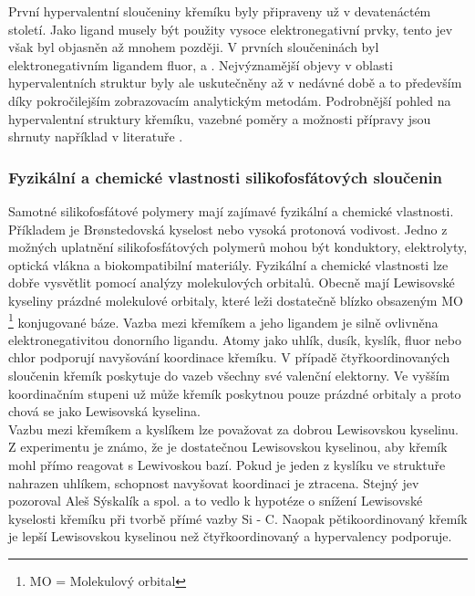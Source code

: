 \documentclass[
  digital, %
  table,   %
  lof,     %
  lot,     %
]{fithesis3}
\begin{document}
První hypervalentní sloučeniny křemíku byly připraveny už v devatenáctém století. Jako ligand musely být použity vysoce elektronegativní prvky, tento jev však byl objasněn až mnohem později. V prvních sloučeninách byl elektronegativním ligandem fluor,  a . Nejvýznamější objevy v oblasti hypervalentních struktur byly ale uskutečněny až v nedávné době a to především díky pokročilejším zobrazovacím analytickým metodám. Podrobnější pohled na hypervalentní struktury křemíku, vazebné poměry a možnosti přípravy jsou shrnuty například v literatuře \cite{Wagler2014}.\\

\subsubsection{Fyzikální a chemické vlastnosti silikofosfátových sloučenin}
Samotné silikofosfátové polymery mají zajímavé fyzikální a chemické vlastnosti. Příkladem je Brønstedovská kyselost nebo vysoká protonová vodivost. Jedno z možných uplatnění silikofosfátových polymerů mohou být konduktory, elektrolyty, optická vlákna a biokompatibilní materiály. Fyzikální a chemické vlastnosti lze dobře vysvětlit pomocí analýzy molekulových orbitalů. Obecně mají Lewisovské kyseliny prázdné molekulové orbitaly, které leži dostatečně blízko obsazeným MO \footnote{MO = Molekulový orbital} konjugované báze. Vazba mezi křemíkem a jeho ligandem je silně ovlivněna elektronegativitou donorního ligandu. Atomy jako uhlík, dusík, kyslík, fluor nebo chlor podporují navyšování koordinace křemíku. V případě čtyřkoordinovaných sloučenin křemík poskytuje do vazeb všechny své valenční elektorny. Ve vyšším koordinačním stupeni už může křemík poskytnou pouze prázdné orbitaly a proto chová se jako Lewisovská kyselina.\\

Vazbu mezi křemíkem a kyslíkem lze považovat za dobrou Lewisovskou kyselinu. Z experimentu je známo, že  je dostatečnou Lewisovskou kyselinou, aby křemík mohl přímo reagovat s Lewivoskou bazí. Pokud je jeden z kyslíku ve struktuře nahrazen uhlíkem, schopnost navyšovat koordinaci je ztracena. Stejný jev pozoroval Aleš Sýskalík a spol. \cite{Styskalik2015thesis} a to vedlo k hypotéze o snížení Lewisovské kyselosti křemíku při tvorbě přímé vazby Si - C. Naopak pětikoordinovaný křemík je lepší Lewisovskou kyselinou než čtyřkoordinovaný a hypervalency podporuje.\cite{Wagler2014}\\
\end{document}
